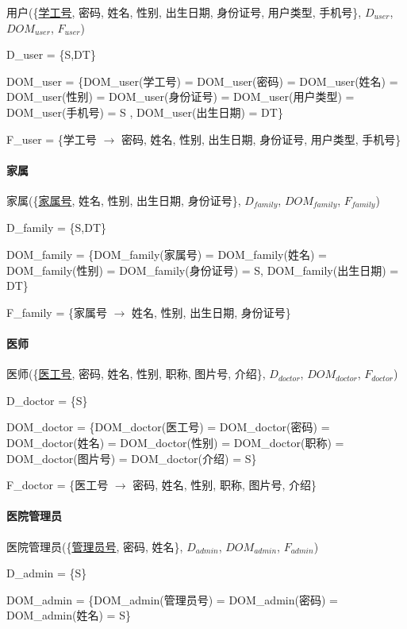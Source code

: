 \documentclass{article}
\begin{document}
用户(\{\underline{学工号}, 密码, 姓名, 性别, 出生日期, 身份证号, 用户类型, 手机号\}, $D_{user}$, $DOM_{user}$, $F_{user}$)

D\_user = \{S,DT\}

DOM\_user = \{DOM\_user(学工号) = DOM\_user(密码) = DOM\_user(姓名) = DOM\_user(性别) = DOM\_user(身份证号) = DOM\_user(用户类型) = DOM\_user(手机号) = S , DOM\_user(出生日期) = DT\}

F\_user = \{学工号 $\rightarrow$ 密码, 姓名, 性别, 出生日期, 身份证号, 用户类型, 手机号\}

\paragraph{家属}

家属(\{\underline{家属号}, 姓名, 性别, 出生日期, 身份证号\}, $D_{family}$, $DOM_{family}$, $F_{family}$)

D\_family = \{S,DT\}

DOM\_family = \{DOM\_family(家属号) = DOM\_family(姓名) = DOM\_family(性别) = DOM\_family(身份证号) = S, DOM\_family(出生日期) = DT\}

F\_family = \{家属号 $\rightarrow$ 姓名, 性别, 出生日期, 身份证号\}

\paragraph{医师}

医师(\{\underline{医工号}, 密码, 姓名, 性别, 职称, 图片号, 介绍\}, $D_{doctor}$, $DOM_{doctor}$, $F_{doctor}$)

D\_doctor = \{S\}

DOM\_doctor = \{DOM\_doctor(医工号) = DOM\_doctor(密码) = DOM\_doctor(姓名) = \newline DOM\_doctor(性别) = DOM\_doctor(职称) = DOM\_doctor(图片号) = DOM\_doctor(介绍) = S\}

F\_doctor = \{医工号 $\rightarrow$ 密码, 姓名, 性别, 职称, 图片号, 介绍\}

\paragraph{医院管理员}

医院管理员(\{\underline{管理员号}, 密码, 姓名\}, $D_{admin}$, $DOM_{admin}$, $F_{admin}$)

D\_admin = \{S\}

DOM\_admin = \{DOM\_admin(管理员号) = DOM\_admin(密码) = DOM\_admin(姓名) = S\}
\end{document}
